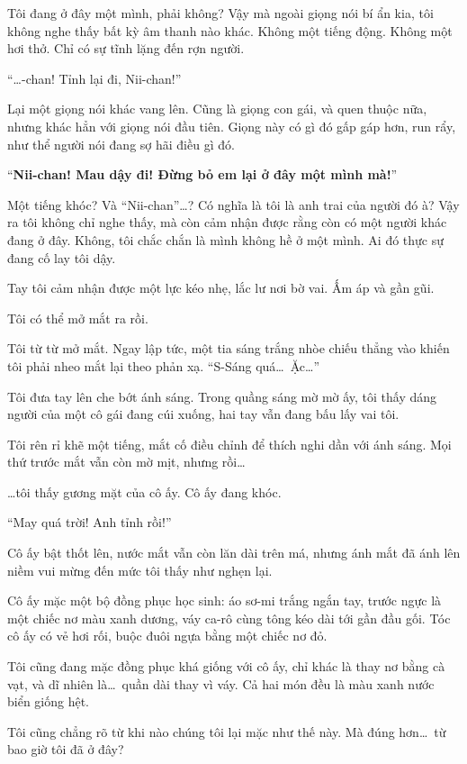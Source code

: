 \documentclass[../main.tex]{subfiles}
\begin{document}
Tôi đang ở đây một mình, phải không? Vậy mà ngoài giọng nói bí ẩn kia, tôi không nghe thấy bất kỳ âm thanh nào khác. Không một tiếng động. Không một hơi thở. Chỉ có sự tĩnh lặng đến rợn người.

\ct

``\dots -chan! Tỉnh lại đi, Nii-chan!''

Lại một giọng nói khác vang lên. Cũng là giọng con gái, và quen thuộc nữa, nhưng khác hẳn với giọng nói đầu tiên. Giọng này có gì đó gấp gáp hơn, run rẩy, như thể người nói đang sợ hãi điều gì đó.

``\textbf{Nii-chan! Mau dậy đi! Đừng bỏ em lại ở đây một mình mà!}''

Một tiếng khóc? Và ``Nii-chan''\dots? Có nghĩa là tôi là anh trai của người đó à? Vậy ra tôi không chỉ nghe thấy, mà còn cảm nhận được rằng còn có một người khác đang ở đây. Không, tôi chắc chắn là mình không hề ở một mình. Ai đó thực sự đang cố lay tôi dậy.

Tay tôi cảm nhận được một lực kéo nhẹ, lắc lư nơi bờ vai. Ấm áp và gần gũi.

Tôi có thể mở mắt ra rồi.

Tôi từ từ mở mắt. Ngay lập tức, một tia sáng trắng nhòe chiếu thẳng vào khiến tôi phải nheo mắt lại theo phản xạ. ``S-Sáng quá\dots\ Ặc\dots''

Tôi đưa tay lên che bớt ánh sáng. Trong quầng sáng mờ mờ ấy, tôi thấy dáng người của một cô gái đang cúi xuống, hai tay vẫn đang bấu lấy vai tôi.

Tôi rên rỉ khẽ một tiếng, mắt cố điều chỉnh để thích nghi dần với ánh sáng. Mọi thứ trước mắt vẫn còn mờ mịt, nhưng rồi\dots

\dots tôi thấy gương mặt của cô ấy. Cô ấy đang khóc.

``May quá trời! Anh tỉnh rồi!''

Cô ấy bật thốt lên, nước mắt vẫn còn lăn dài trên má, nhưng ánh mắt đã ánh lên niềm vui mừng đến mức tôi thấy như nghẹn lại.

Cô ấy mặc một bộ đồng phục học sinh: áo sơ-mi trắng ngắn tay, trước ngực là một chiếc nơ màu xanh dương, váy ca-rô cùng tông kéo dài tới gần đầu gối. Tóc cô ấy có vẻ hơi rối, buộc đuôi ngựa bằng một chiếc nơ đỏ.

Tôi cũng đang mặc đồng phục khá giống với cô ấy, chỉ khác là thay nơ bằng cà vạt, và dĩ nhiên là\dots\ quần dài thay vì váy. Cả hai món đều là màu xanh nước biển giống hệt.

Tôi cũng chẳng rõ từ khi nào chúng tôi lại mặc như thế này. Mà đúng hơn\dots\ từ bao giờ tôi đã ở đây?
\end{document}
